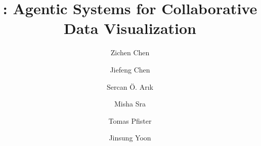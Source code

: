 \documentclass[11pt, a4paper, logo, copyright]{googlecloud}
\title{\methodname{}: Agentic Systems for Collaborative Data Visualization}
\author[1 2 *]{Zichen Chen}
\author[1]{Jiefeng Chen}
\author[1]{Sercan Ö. Arık}
\author[2]{Misha Sra}
\author[1]{Tomas Pfister}
\author[1]{Jinsung Yoon}
\affil[1]{Google Cloud AI Research}
\affil[2]{University of California, Santa Barbara}
\begin{document}
\maketitle


















\nobibliography*


\clearpage

\appendix






\end{document}
